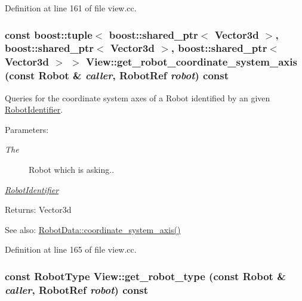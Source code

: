 Definition at line 161 of file view.cc.\hypertarget{class_view_d09f4f177a41f7ea019a08a6dcde3009}{
\subsubsection[get\_\-robot\_\-coordinate\_\-system\_\-axis]{\setlength{\rightskip}{0pt plus 5cm}const boost::tuple$<$ boost::shared\_\-ptr$<$ Vector3d $>$, boost::shared\_\-ptr$<$ Vector3d $>$, boost::shared\_\-ptr$<$ Vector3d $>$ $>$ View::get\_\-robot\_\-coordinate\_\-system\_\-axis (const Robot \& {\em caller}, \/  RobotRef {\em robot}) const}}
\label{class_view_d09f4f177a41f7ea019a08a6dcde3009}


Queries for the coordinate system axes of a Robot identified by an given \hyperlink{class_robot_identifier}{RobotIdentifier}. \begin{Desc}
\item[Parameters:]
\begin{description}
\item[{\em The}]Robot which is asking.. \item[{\em \hyperlink{class_robot_identifier}{RobotIdentifier}}]\end{description}
\end{Desc}
\begin{Desc}
\item[Returns:]Vector3d \end{Desc}
\begin{Desc}
\item[See also:]\hyperlink{class_robot_data_e093fc063e47ad844c20a9332c5bea6a}{RobotData::coordinate\_\-system\_\-axis()} \end{Desc}


Definition at line 165 of file view.cc.\hypertarget{class_view_ce82208b7d2bf96fbc80d6181c8702cc}{
\subsubsection[get\_\-robot\_\-type]{\setlength{\rightskip}{0pt plus 5cm}const RobotType View::get\_\-robot\_\-type (const Robot \& {\em caller}, \/  RobotRef {\em robot}) const}}
\label{class_view_ce82208b7d2bf96fbc80d6181c8702cc}


